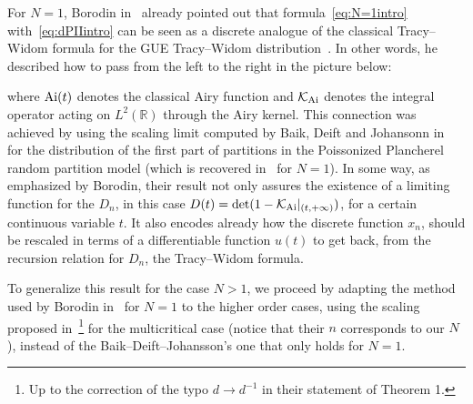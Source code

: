 \documentclass[pdftex]{sigma}%
\numberwithin{equation}{section}
\newcommand{\R}{\mathbb{R}}
\newcommand{\Ai}{{\rm Ai}}
\begin{document}
For $N=1$, Borodin in~\cite{Borodindiscrete} already pointed out that formula~\eqref{eq:N=1intro} with~\eqref{eq:dPIIintro} can be seen as a discrete analogue of the classical Tracy--Widom formula for the GUE Tracy--Widom distribution~\cite{TW94,TracyWidom}.
In other words, he described how to pass from the left to the right in the picture below:
\begin{center}
\end{center}
where $\Ai(t)$ denotes the classical Airy function and $\mathcal{K}_\Ai$ denotes the integral operator acting on $L^2(\R)$ through the Airy kernel.
This connection was achieved by using the scaling limit computed by Baik, Deift and Johansonn in~\cite{baik1999distribution} for the distribution of the first part of partitions in the Poissonized Plancherel random partition model (which is recovered in~\cite[Theorem~1]{betea2021multicritical} for $N=1$). In some way, as emphasized by Borodin, their result not only assures the existence of a limiting function for the $D_n$, in this case $ D(t)= \det (1-\mathcal{K}_\Ai|_{(t,+\infty)})$, for a certain continuous variable $t$. It also encodes already how the discrete function $x_n$, should be rescaled in terms of a differentiable function $u(t)$ to get back, from the recursion relation for $D_n$, the Tracy--Widom formula.

To generalize this result for the case $N>1$, we proceed by adapting the method used by Borodin in~\cite{Borodindiscrete} for $N=1$ to the higher order cases, using the scaling proposed in~\cite{betea2021multicritical}\footnote{Up to the correction of the typo $d\rightarrow d^{-1}$ in their statement of Theorem 1.} for the multicritical case (notice that their $n$ corresponds to our $N$), instead of the Baik--Deift--Johansson's one that only holds for $N=1$.
\end{document}
